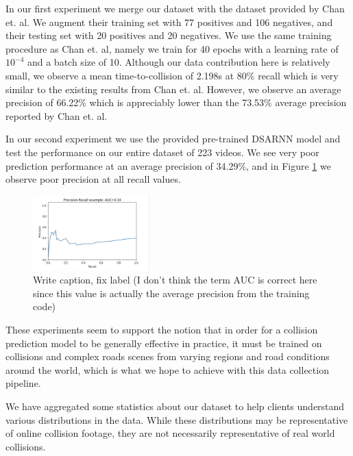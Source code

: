 \documentclass[letterpaper, 10 pt, conference]{IEEEconf}
\newcommand{\todo}[1]{{\color{red}#1}}
\begin{document}
In our first experiment we merge our dataset with the dataset provided by Chan et. al. We augment their training set with 77 positives and 106 negatives, and their testing set with 20 positives and 20 negatives. We use the same training procedure as Chan et. al, namely we train for 40 epochs with a learning rate of $10^{-4}$ and a batch size of 10. Although our data contribution here is relatively small, we observe a mean time-to-collision of 2.198s at 80\% recall which is very similar to the existing results from Chan et. al. However, we observe an average precision of 66.22\% which is appreciably lower than the 73.53\% average precision reported by Chan et. al. \cite{chan2016anticipating}

In our second experiment we use the provided pre-trained DSARNN model and test the performance on our entire dataset of 223 videos. We see very poor prediction performance at an average precision of 34.29\%, and in Figure \ref{fig:pr_curve} we observe poor precision at all recall values.

\begin{figure}[htpb]
		\centering
		\includegraphics[width=0.4\textwidth]{prcurve.png}
		\caption{\todo{Write caption, fix label (I don't think the term AUC is correct here since this value is actually the average precision from the training code)}}
		\label{fig:pr_curve}
\end{figure}

These experiments seem to support the notion that in order for a collision prediction model to be generally effective in practice, it must be trained on collisions and complex roads scenes from varying regions and road conditions around the world, which is what we hope to achieve with this data collection pipeline.






\byclass
{}\byactors
{}\byagents
{}\byduration

We have aggregated some statistics about our dataset to help clients understand various distributions in the data. While these distributions may be representative of online collision footage, they are not necessarily representative of real world collisions. 
\end{document}
